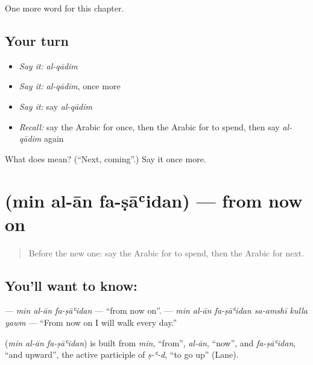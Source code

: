 \begin{grammarlens}[title={What you've built}]
One more word for this chapter.
\end{grammarlens}

\subsection*{Your turn}
\begin{itemize}
\raggedright
  \item \emph{Say it:} \emph{al-qādim}
  \item \emph{Say it:} \emph{al-qādim}, once more
  \item \emph{Say it:} say \emph{al-qādim}
  \item \emph{Recall:} say the Arabic for once, then the Arabic for to spend, then say \emph{al-qādim} again
\end{itemize}

\begin{tcolorbox}[breakable,colback=teal!4,colframe=teal!35!black,title={Before you move on}]
What does  mean? (\textquotedblleft{}Next, coming\textquotedblright{}.) Say it once more.
\end{tcolorbox}
\section[\texorpdfstring{\ar{من} \ar{الآن} \ar{فصاعدا} (min al-ān fa-ṣāʿidan)}{من الآن فصاعدا (min al-ān fa-ṣāʿidan)}]{   (min al-ān fa-ṣāʿidan) — from now on}

\label{lesson:AR-C157-min-al-an-fasaidan}



\begin{quote}
Before the new one: say the Arabic for to spend, then the Arabic for next.
\end{quote}

\subsection*{You'll want to know:   }
\textbf{  } — \emph{min al-ān fa-ṣāʿidan} — \textquotedblleft{}from now on\textquotedblright{}. \textbf{     } — \emph{min al-ān fa-ṣāʿidan sa-amshī kulla yawm} — \textquotedblleft{}From now on I will walk every day.\textquotedblright{}

\begin{cousinweb}
\textbf{  } (\emph{min al-ān fa-ṣāʿidan}) is built from \emph{min}, \textquotedblleft{}from\textquotedblright{}, \emph{al-ān}, \textquotedblleft{}now\textquotedblright{}, and \emph{fa-ṣāʿidan}, \textquotedblleft{}and upward\textquotedblright{}, the active participle of \emph{ṣ-ʿ-d}, \textquotedblleft{}to go up\textquotedblright{} (Lane).
\end{cousinweb}

